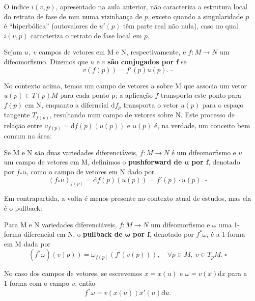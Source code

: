 \documentclass[../differential_topology.tex]{subfiles}
\begin{document}
O índice \(i(v, p)\), apresentado na aula anterior, não caracteriza a estrutura local do retrato de fase de mm numa vizinhança de \(p\), exceto quando a singularidade \(p\) é ``hiperbólica'' (autovalores de \(u'(p)\) têm parte real não nula), caso no qual \(i(v, p)\) caracteriza o retrato de fase local em \(p\).

\begin{def*}
	Sejam \(u,\; v\) campos de vetores em M e N, respectivamente, e \(f:M\rightarrow N\) um difeomorfismo. Dizemos que \(u\) e \(v\) \textbf{são conjugados por \(\mathbf{f}\)} se
	\[
		v(f(p)) = f'(p)u(p).\; \square
	\]
\end{def*}
No contexto acima, temos um campo de vetores \(u\) sobre M que associa um vetor \(u(p)\in T(p)M\) para cada ponto p; a aplicação \(f\) transporta este ponto para \(f(p)\) em N, enquanto a diferncial \(\mathrm{d}f_p\) transporta o vetor \(u(p)\) para o espaço tangente \(T_{f(p)}\), resultando num campo de vetores sobre N. Este processo de relação entre \(v_{f(p)} = \mathrm{d}f(p)(u(p))\) e \(u(p)\) é, na verdade, um conceito bem comum na área:
\begin{def*}
	Se M e N são duas variedades diferenciáveis, \(f:M\rightarrow N\) é um difeomorfismo e \(u\) um campo de vetores em M, definimos o \textbf{pushforward de \(\mathbf{u}\) por \(\mathbf{f}\)}, denotado por \(f_{*}u\), como o campo de vetores em N dado por
	\[
		(f_{*}u)_{f(p)} = \mathrm{d}f(p)(u(p)) = f'(p)\cdot u(p).\; \square
	\]
\end{def*}
Em contrapartida, a volta é menos presente no contexto atual de estudos, mas ela é o pullback:
\begin{def*}
	Para M e N variedades diferenciáveis, \(f:M\rightarrow N\) um difeomorfismo e \(\omega \) uma 1-forma diferencial em N, o \textbf{pullback de \(\mathbf{\omega }\) por \(\mathbf{f}\)}, denotado por \(f^{*}\omega \), é a 1-forma em M dada por
	\[
		(f^{*}\omega )(v(p))= \omega_{f(p)}(f'(v(p))), \quad \forall p\in M,\; v\in T_{p}M.\; \square
	\]
\end{def*}
No caso dos campos de vetores, se escrevemos \(x = x(u)\) e \(\omega = v(x)\mathrm{d}x\) para a 1-forma com o campo \(v\), então
\[
	f^{*}\omega  = v(x(u))x'(u)\mathrm{d}u.
\]
\end{document}
